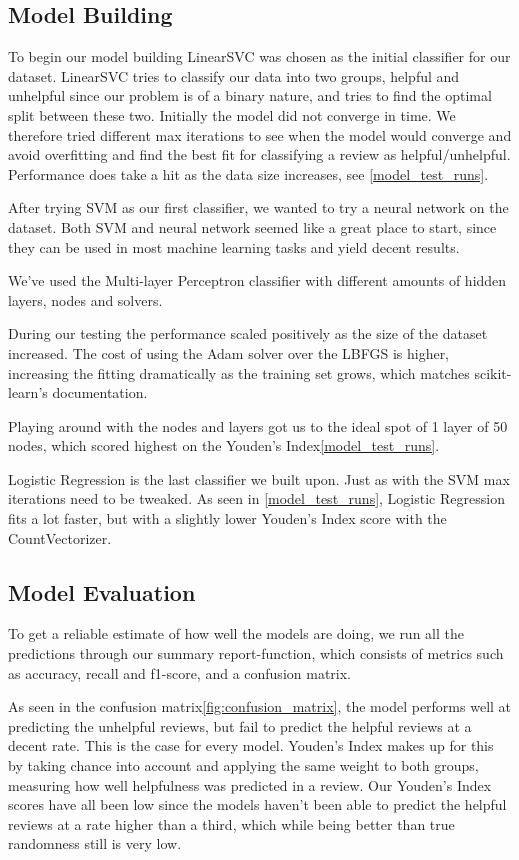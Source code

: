 \documentclass[twoside,twocolumn]{article}
\begin{document}
\subsection{Model Building}
To begin our model building LinearSVC was chosen as the initial classifier for our dataset. LinearSVC tries to classify our data into two groups, helpful and unhelpful since our problem is of a binary nature, and tries to find the optimal split between these two. Initially the model did not converge in time. We therefore tried different max iterations to see when the model would converge and avoid overfitting and find the best fit for classifying a review as helpful/unhelpful. Performance does take a hit as the data size increases, see \figurename{\ref{model_test_runs}}.

After trying SVM as our first classifier, we wanted to try a neural network on the dataset. Both SVM and neural network seemed like a great place to start, since they can be used in most machine learning tasks and yield decent results.

We've used the Multi-layer Perceptron classifier with different amounts of hidden layers, nodes and solvers.

During our testing the performance scaled positively as the size of the dataset increased. The cost of using the Adam solver over the LBFGS is higher, increasing the fitting dramatically as the training set grows, which matches scikit-learn's documentation\cite{sklearn:MLPClassifier}.

Playing around with the nodes and layers got us to the ideal spot of 1 layer of 50 nodes, which scored highest on the Youden's Index\ref{model_test_runs}.

Logistic Regression is the last classifier we built upon. Just as with the SVM max iterations need to be tweaked. As seen in \figurename{\ref{model_test_runs}}, Logistic Regression fits a lot faster, but with a slightly lower Youden’s Index score with the CountVectorizer.

\subsection{Model Evaluation}
To get a reliable estimate of how well the models are doing, we run all the predictions through our summary report-function, which consists of metrics such as accuracy, recall and f1-score, and a confusion matrix.

As seen in the confusion matrix\ref{fig:confusion_matrix}, the model performs well at predicting the unhelpful reviews, but fail to predict the helpful reviews at a decent rate. This is the case for every model. Youden's Index makes up for this by taking chance into account and applying the same weight to both groups, measuring how well helpfulness was predicted in a review. Our Youden's Index scores have all been low since the models haven't been able to predict the helpful reviews at a rate higher than a third, which while being better than true randomness still is very low.
\end{document}
